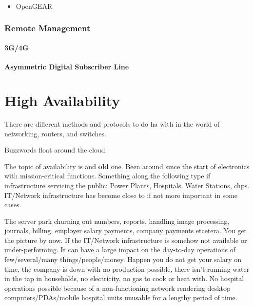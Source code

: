 \begin{itemize}
	\item OpenGEAR
\end{itemize}

\subsection[Remote Mgmt]{Remote Management}

\subsubsection{3G/4G}

\subsubsection[ADSL]{Asymmetric Digital Subscriber Line}


\chapter[HA]{High Availability}


There are different methods and protocols to do \gls{ha} with in the world of networking, routers, and switches.

Buzzwords float around the cloud.

The topic of availability is and \textbf{old} one. Been around since the start of electronics with \textit{} mission-critical functions. Something along the following type if infrastructure servicing the public: Power Plants, Hospitals, Water Stations, \glspl{chp}. IT/Network infrastructure has become close to if not more important in some cases.

The server park churning out numbers, reports, handling image processing, journals, billing, employer salary payments, company payments etcetera. You get the picture by now. If the IT/Network infrastructure is somehow not available or under-performing. It can have a large impact on the day-to-day operations of few/several/many things/people/money. Happen you do not get your salary on time, the company is down with no production possible, there isn't running water in the tap in households, no electricity, no gas to cook or heat with. No hospital operations possible because of a non-functioning network rendering desktop computers/PDAs/mobile hospital units unusable for a lengthy period of time.


